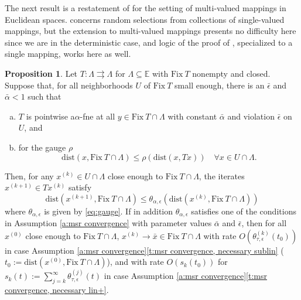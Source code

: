 \documentclass[12pt]{article}
\theoremstyle{definition}
\newtheorem{proposition}{Proposition}
\renewcommand{\equiv}{:=}
\newcommand{\paren}[1]{\left(#1\right)}
\newcommand{\Ebb}{\mathbb{E}}
\newcommand{\dist}{\mathrm{dist}}
\newcommand{\Fix}{\mathrm{Fix}\ }
\begin{document}
The next result is a restatement of \cite[Theorem 7]{luke23} for the setting of multi-valued mappings
in Euclidean spaces. \cite[Theorem 7]{luke23} concerns random selections from collections of
single-valued mappings, but the extension to multi-valued mappings presents no difficulty here since
we are in the deterministic case,
and logic of the proof of \cite[Theorem 7]{luke23}, specialized to a single mapping, works here as well.
\begin{proposition}\label{t:metric.subreg.convergence} Let $T:\Lambda\rightrightarrows \Lambda$ for
$\Lambda\subseteq\Ebb$ with $\Fix T$ nonempty and closed.
Suppose that, for all neighborhoods $U$ of $\Fix T$ small enough, there is an  $\bar\epsilon$
and $\bar\alpha<1$ such that
\begin{enumerate}[(a)]%
   \item $T$ is pointwise a$\alpha$-fne at all $y\in \Fix T\cap \Lambda$ with constant $\bar\alpha$ and
       violation $\bar\epsilon$ on  $U$, and
   \item for the gauge $\rho$
   \begin{equation}\label{e:msr}
    \dist(x,\Fix T\cap \Lambda)\leq \rho(\dist(x, Tx))\quad\forall x\in U\cap \Lambda.
   \end{equation}
\end{enumerate}
Then, for any $x^{(k)}\in U\cap\Lambda$ close enough to $\Fix T\cap \Lambda$, the iterates $x^{(k+1)}\in Tx^{(k)}$ satisfy
\begin{equation}%
\dist(x^{(k+1)}, \Fix T\cap \Lambda)
\leq \theta_{\alpha, \epsilon}\paren{\dist\paren{x^{(k)}, \Fix T\cap \Lambda}}
\end{equation}%
where $\theta_{\alpha, \epsilon}$ is given by \eqref{eq:gauge}.
If in addition $\theta_{\alpha, \epsilon}$ satisfies one of the
conditions in Assumption \ref{a:msr convergence} with parameter values
$\bar\alpha$ and $\bar\epsilon$, then for all $x^{(0)}$ close enough to
$\Fix T\cap \Lambda$, $x^{(k)}\to \bar x\in \Fix T\cap \Lambda$
with rate
 $O\paren{\theta_{\tau, \epsilon}^{(k)}(t_0)}$ in case
 Assumption \ref{a:msr convergence}\eqref{t:msr convergence, necessary sublin}
 ($t_0\equiv\dist(x^{(0)}, \Fix T\cap \Lambda)$),
 and with rate  $O(s_k(t_0))$ for
$s_k(t)\equiv
\sum_{j=k}^\infty \theta_{\tau, \epsilon}^{(j)}(t)$
in case Assumption \ref{a:msr convergence}\eqref{t:msr convergence, necessary lin+}.
\end{proposition}
\end{document}
